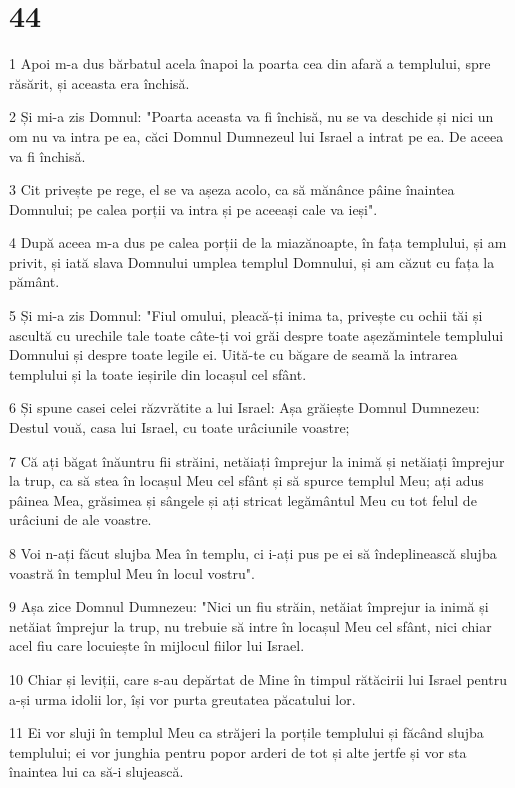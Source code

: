 \chapter{44}

\par 1 Apoi m-a dus bărbatul acela înapoi la poarta cea din afară a templului, spre răsărit, și aceasta era închisă.
\par 2 Și mi-a zis Domnul: "Poarta aceasta va fi închisă, nu se va deschide și nici un om nu va intra pe ea, căci Domnul Dumnezeul lui Israel a intrat pe ea. De aceea va fi închisă.
\par 3 Cit privește pe rege, el se va așeza acolo, ca să mănânce pâine înaintea Domnului; pe calea porții va intra și pe aceeași cale va ieși".
\par 4 După aceea m-a dus pe calea porții de la miazănoapte, în fața templului, și am privit, și iată slava Domnului umplea templul Domnului, și am căzut cu fața la pământ.
\par 5 Și mi-a zis Domnul: "Fiul omului, pleacă-ți inima ta, privește cu ochii tăi și ascultă cu urechile tale toate câte-ți voi grăi despre toate așezămintele templului Domnului și despre toate legile ei. Uită-te cu băgare de seamă la intrarea templului și la toate ieșirile din locașul cel sfânt.
\par 6 Și spune casei celei răzvrătite a lui Israel: Așa grăiește Domnul Dumnezeu: Destul vouă, casa lui Israel, cu toate urâciunile voastre;
\par 7 Că ați băgat înăuntru fii străini, netăiați împrejur la inimă și netăiați împrejur la trup, ca să stea în locașul Meu cel sfânt și să spurce templul Meu; ați adus pâinea Mea, grăsimea și sângele și ați stricat legământul Meu cu tot felul de urâciuni de ale voastre.
\par 8 Voi n-ați făcut slujba Mea în templu, ci i-ați pus pe ei să îndeplinească slujba voastră în templul Meu în locul vostru".
\par 9 Așa zice Domnul Dumnezeu: "Nici un fiu străin, netăiat împrejur ia inimă și netăiat împrejur la trup, nu trebuie să intre în locașul Meu cel sfânt, nici chiar acel fiu care locuiește în mijlocul fiilor lui Israel.
\par 10 Chiar și leviții, care s-au depărtat de Mine în timpul rătăcirii lui Israel pentru a-și urma idolii lor, își vor purta greutatea păcatului lor.
\par 11 Ei vor sluji în templul Meu ca străjeri la porțile templului și făcând slujba templului; ei vor junghia pentru popor arderi de tot și alte jertfe și vor sta înaintea lui ca să-i slujească.
